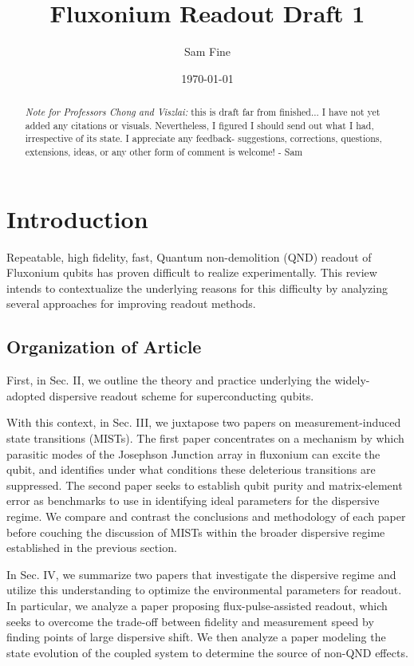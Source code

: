 \documentclass[
 reprint,
 superscriptaddress,
 bibnotes,
 amsmath,
 amssymb,
 aps,
 prb,
 citeautoscript,
 floatfix,
]{revtex4-2}
\begin{document}
\title{Fluxonium Readout Draft 1}
\author{Sam Fine}

\date{\today}

\begin{abstract}
\textit{Note for Professors Chong and Viszlai:} this is draft far from finished... I have not yet added any citations or visuals. Nevertheless, I figured I should send out what I had, irrespective of its state. I appreciate any feedback- suggestions, corrections, questions, extensions, ideas, or any other form of comment is welcome! - Sam
\end{abstract}

\maketitle

\section{Introduction}
     Repeatable, high fidelity, fast, Quantum non-demolition (QND) readout of Fluxonium qubits has proven difficult to realize experimentally. This review intends to contextualize the underlying reasons for this difficulty by analyzing several approaches for improving readout methods. 

\subsection{ Organization of Article}
 First, in Sec. II, we outline the theory and practice underlying the widely-adopted dispersive readout scheme for superconducting qubits. 

With this context, in Sec. III, we juxtapose two papers on measurement-induced state transitions (MISTs). The first paper concentrates on a mechanism by which parasitic modes of the Josephson Junction array in fluxonium can excite the qubit, and identifies under what conditions these deleterious transitions are suppressed. The second paper seeks to establish qubit purity and matrix-element error as benchmarks to use in identifying ideal parameters for the dispersive regime. We compare and contrast the conclusions and methodology of each paper before couching the discussion of MISTs within the broader dispersive regime established in the previous section.

In Sec. IV, we summarize two papers that investigate the dispersive regime and utilize this understanding to optimize the environmental parameters for readout. In particular, we analyze a paper proposing flux-pulse-assisted readout, which  seeks to overcome the trade-off between fidelity and measurement speed by finding points of large dispersive shift. We then analyze a paper modeling the state evolution of the coupled system to determine the source of non-QND effects.
\end{document}
